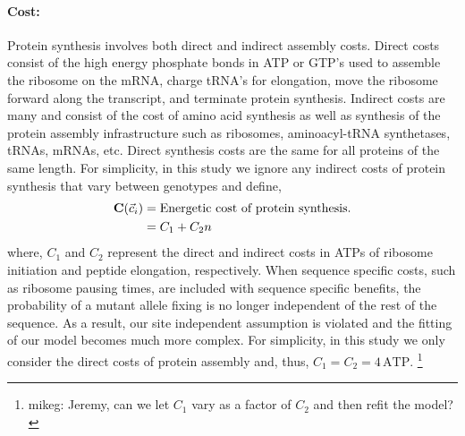 \documentclass{article}
\newcommand{\Costcveci}{\ensuremath{\Cost(\cveci)}\xspace}
\newcommand{\Cost}{\ensuremath{\text{\textbf{C}}}\xspace}
\newcommand{\cveci}{\ensuremath{\cvec_i}\xspace}
\newcommand{\cvec}{\ensuremath{\Vec{c}}\xspace}
\begin{document}
\paragraph*{Cost:}
Protein synthesis involves both direct and indirect assembly costs.
Direct costs consist of the high energy phosphate bonds in ATP or GTP's used to assemble the ribosome on the mRNA, charge tRNA's for elongation, move the ribosome forward along the transcript, and terminate protein synthesis.
Indirect costs are many and consist of the cost of amino acid synthesis as well as synthesis of the protein assembly infrastructure such as ribosomes, aminoacyl-tRNA synthetases, tRNAs, mRNAs, etc.
Direct synthesis costs are the same for all proteins of the same length.
For simplicity, in this study we ignore any indirect costs of protein synthesis that vary between genotypes and define, 
\begin{align}
\label{eq:defineCost}
  \Costcveci  &= \text{Energetic cost of protein synthesis.}\\
  &= C_1 + C_2 n
\end{align}
where, $C_1$ and $C_2$ represent the direct and indirect costs in ATPs of ribosome initiation and peptide elongation, respectively.
When sequence specific costs, such as ribosome pausing times, are included with sequence specific benefits, the probability of a mutant allele fixing is no longer independent of the rest of the sequence.
As a result, our site independent assumption is violated and the fitting of our model becomes much more complex.
For simplicity, in this study we only consider the direct costs of protein assembly and, thus, $C_1 = C_2 = 4  \,\text{ATP}$.
\footnote{mikeg: Jeremy, can we let $C_1$ vary as a factor of $C_2$ and then refit the model?}
 
\end{document}
